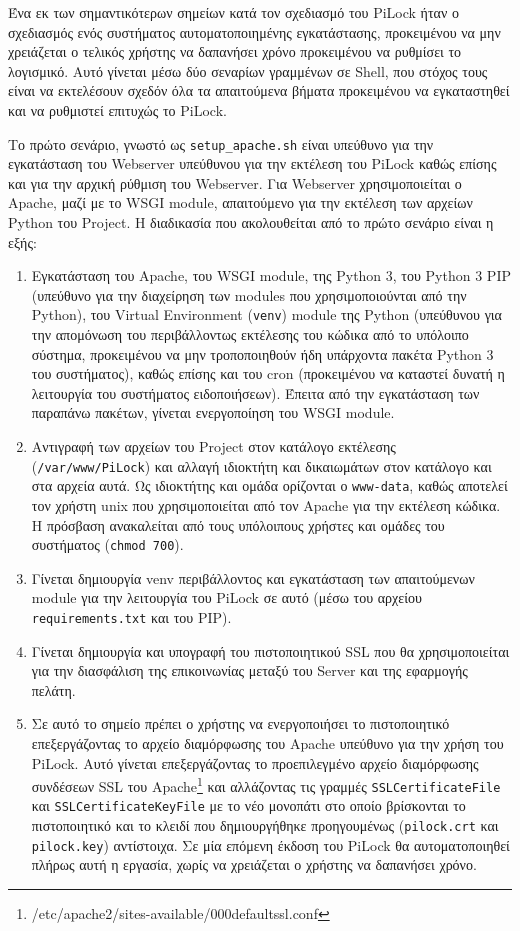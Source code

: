 Ένα εκ των σημαντικότερων σημείων κατά τον σχεδιασμό του PiLock ήταν ο σχεδιασμός ενός συστήματος αυτοματοποιημένης εγκατάστασης, προκειμένου να μην χρειάζεται ο τελικός χρήστης να δαπανήσει χρόνο προκειμένου να ρυθμίσει το λογισμικό. Αυτό γίνεται μέσω δύο σεναρίων γραμμένων σε Shell, που στόχος τους είναι να εκτελέσουν σχεδόν όλα τα απαιτούμενα βήματα προκειμένου να εγκαταστηθεί και να ρυθμιστεί επιτυχώς το PiLock.

Το πρώτο σενάριο, γνωστό ως \verb|setup_apache.sh| είναι υπεύθυνο για την εγκατάσταση του Webserver υπεύθυνου για την εκτέλεση του PiLock καθώς επίσης και για την αρχική ρύθμιση του Webserver. Για Webserver χρησιμοποιείται ο Apache, μαζί με το WSGI module, απαιτούμενο για την εκτέλεση των αρχείων Python του Project. Η διαδικασία που ακολουθείται από το πρώτο σενάριο είναι η εξής:

\begin{enumerate}
	\item Εγκατάσταση του Apache, του WSGI module, της Python 3, του Python 3 PIP (υπεύθυνο για την διαχείρηση των modules που χρησιμοποιούνται από την Python), του Virtual Environment (\verb|venv|) module της Python (υπεύθυνου για την απομόνωση του περιβάλλοντως εκτέλεσης του κώδικα από το υπόλοιπο σύστημα, προκειμένου να μην τροποποιηθούν ήδη υπάρχοντα πακέτα Python 3 του συστήματος), καθώς επίσης και του cron (προκειμένου να καταστεί δυνατή η λειτουργία του συστήματος ειδοποιήσεων). Έπειτα από την εγκατάσταση των παραπάνω πακέτων, γίνεται ενεργοποίηση του WSGI module.
	\item Αντιγραφή των αρχείων του Project στον κατάλογο εκτέλεσης (\verb|/var/www/PiLock|) και αλλαγή ιδιοκτήτη και δικαιωμάτων στον κατάλογο και στα αρχεία αυτά. Ως ιδιοκτήτης και ομάδα ορίζονται ο \verb|www-data|, καθώς αποτελεί τον χρήστη unix που χρησιμοποιείται από τον Apache για την εκτέλεση κώδικα. Η πρόσβαση ανακαλείται από τους υπόλοιπους χρήστες και ομάδες του συστήματος (\verb|chmod 700|).
	\item Γίνεται δημιουργία venv περιβάλλοντος και εγκατάσταση των απαιτούμενων module για την λειτουργία του PiLock σε αυτό (μέσω του αρχείου \verb|requirements.txt| και του PIP).
	\item Γίνεται δημιουργία και υπογραφή του πιστοποιητικού SSL που θα χρησιμοποιείται για την διασφάλιση της επικοινωνίας μεταξύ του Server και της εφαρμογής πελάτη.
	\item Σε αυτό το σημείο πρέπει ο χρήστης να ενεργοποιήσει το πιστοποιητικό επεξεργάζοντας το αρχείο διαμόρφωσης του Apache υπεύθυνο για την χρήση του PiLock. Αυτό γίνεται επεξεργάζοντας το προεπιλεγμένο αρχείο διαμόρφωσης συνδέσεων SSL του Apache\footnote{/etc/apache2/sites-available/000\-default\-ssl.conf} και αλλάζοντας τις γραμμές \verb|SSLCertificateFile| και \verb|SSLCertificateKeyFile| με το νέο μονοπάτι στο οποίο βρίσκονται το πιστοποιητικό και το κλειδί που δημιουργήθηκε προηγουμένως (\verb|pilock.crt| και \verb|pilock.key|) αντίστοιχα. Σε μία επόμενη έκδοση του PiLock θα αυτοματοποιηθεί πλήρως αυτή η εργασία, χωρίς να χρειάζεται ο χρήστης να δαπανήσει χρόνο.
\end{enumerate}
